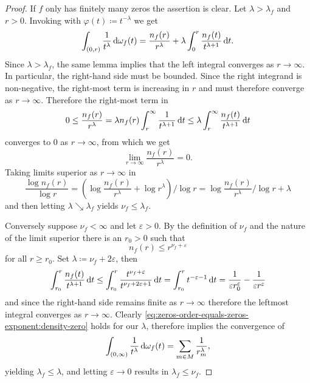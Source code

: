 \begin{proof}
    If $f$ only has finitely many zeros the assertion is clear. Let $\lambda > \lambda_f$ and $r > 0$. Invoking  with $\varphi(t) \coloneqq t^{-\lambda}$ we get
    \begin{equation*}
        \int_{(0, r)} \frac{1}{t^\lambda} \mathop{}\!\mathrm{d} \omega_f(t) = \frac{n_f(r)}{r^\lambda} + \lambda \int_0^r \frac{n_f(t)}{t^{\lambda + 1}} \mathop{}\!\mathrm{d} t.
    \end{equation*}
    Since $\lambda > \lambda_f$, the same lemma implies that the left integral converges as $r \to \infty$. In particular, the right-hand side must be bounded. Since the right integrand is non-negative, the right-most term is increasing in $r$ and must therefore converge as $r \to \infty$. Therefore the right-most term in
    $$ 0 \leq \frac{n_f(r)}{r^\lambda} = \lambda n_f(r) \int_r^\infty \frac{1}{t^{\lambda + 1}} \mathop{}\!\mathrm{d} t \leq \lambda \int_r^\infty \frac{n_f(t)}{t^{\lambda + 1}} \mathop{}\!\mathrm{d} t $$
    converges to $0$ as $r \to \infty$, from which we get
    \begin{equation} \label{eq:zeros-order-equals-zeros-exponent:density-zero}
        \lim_{r \to \infty} \frac{n_f(r)}{r^\lambda} = 0.
    \end{equation}
    Taking limits superior as $r \to \infty$ in
    $$ \frac{\log n_f(r)}{\log r} = \left( \log \frac{n_f(r)}{r^\lambda} + \log r^\lambda\right)/{\log r} = \log \frac{n_f(r)}{r^\lambda} / \log r + \lambda $$
    and then letting $\lambda \searrow \lambda_f$ yields $\nu_f \leq \lambda_f$.

    Conversely suppose $\nu_f < \infty$ and let $\varepsilon > 0$. By the definition of $\nu_f$ and the nature of the limit superior there is an $r_0 > 0$ such that
    $$ n_f(r) \leq r^{\nu_f + \varepsilon} $$
    for all $r \geq r_0$. Set $\lambda \coloneqq \nu_f + 2 \varepsilon$, then
    \begin{equation*}
        \int_{r_0}^r \frac{n_f(t)}{t^{\lambda + 1}} \mathop{}\!\mathrm{d} t \leq
        \int_{r_0}^r \frac{t^{\nu_f + \varepsilon}}{t^{\nu_f + 2\varepsilon + 1}} \mathop{}\!\mathrm{d} t =
        \int_{r_0}^r t^{-\varepsilon - 1} \mathop{}\!\mathrm{d} t = \frac{1}{\varepsilon r_0^{\varepsilon}} - \frac{1}{\varepsilon r^{\varepsilon}}
    \end{equation*}
    and since the right-hand side remains finite as $r \to \infty$ therefore the leftmost integral converges as $r \to \infty$. Clearly \eqref{eq:zeros-order-equals-zeros-exponent:density-zero} holds for our $\lambda$, therefore  implies the convergence of
    \begin{equation*}
        \int_{(0, \infty)} \frac{1}{t^\lambda} \mathop{}\!\mathrm{d} \omega_f(t) = \sum_{m \in M} \frac{1}{r_m^\lambda},
    \end{equation*}
    yielding $\lambda_f \leq \lambda$, and letting $\varepsilon \to 0$ results in $\lambda_f \leq \nu_f$.
\end{proof}

